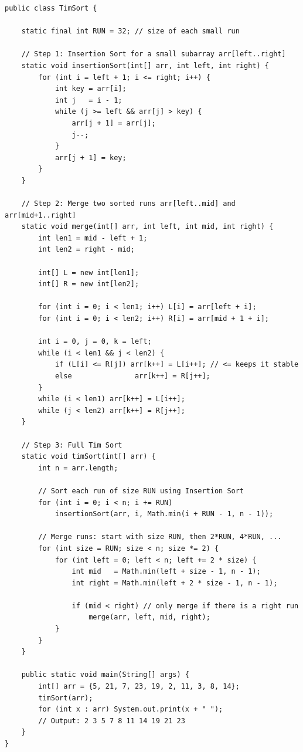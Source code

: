 \documentclass[12pt,a4paper,oneside]{book}
\begin{document}
\begin{lstlisting}[caption={Tim Sort --- simplified implementation showing core idea}]
public class TimSort {

    static final int RUN = 32; // size of each small run

    // Step 1: Insertion Sort for a small subarray arr[left..right]
    static void insertionSort(int[] arr, int left, int right) {
        for (int i = left + 1; i <= right; i++) {
            int key = arr[i];
            int j   = i - 1;
            while (j >= left && arr[j] > key) {
                arr[j + 1] = arr[j];
                j--;
            }
            arr[j + 1] = key;
        }
    }

    // Step 2: Merge two sorted runs arr[left..mid] and arr[mid+1..right]
    static void merge(int[] arr, int left, int mid, int right) {
        int len1 = mid - left + 1;
        int len2 = right - mid;

        int[] L = new int[len1];
        int[] R = new int[len2];

        for (int i = 0; i < len1; i++) L[i] = arr[left + i];
        for (int i = 0; i < len2; i++) R[i] = arr[mid + 1 + i];

        int i = 0, j = 0, k = left;
        while (i < len1 && j < len2) {
            if (L[i] <= R[j]) arr[k++] = L[i++]; // <= keeps it stable
            else               arr[k++] = R[j++];
        }
        while (i < len1) arr[k++] = L[i++];
        while (j < len2) arr[k++] = R[j++];
    }

    // Step 3: Full Tim Sort
    static void timSort(int[] arr) {
        int n = arr.length;

        // Sort each run of size RUN using Insertion Sort
        for (int i = 0; i < n; i += RUN)
            insertionSort(arr, i, Math.min(i + RUN - 1, n - 1));

        // Merge runs: start with size RUN, then 2*RUN, 4*RUN, ...
        for (int size = RUN; size < n; size *= 2) {
            for (int left = 0; left < n; left += 2 * size) {
                int mid   = Math.min(left + size - 1, n - 1);
                int right = Math.min(left + 2 * size - 1, n - 1);

                if (mid < right) // only merge if there is a right run
                    merge(arr, left, mid, right);
            }
        }
    }

    public static void main(String[] args) {
        int[] arr = {5, 21, 7, 23, 19, 2, 11, 3, 8, 14};
        timSort(arr);
        for (int x : arr) System.out.print(x + " ");
        // Output: 2 3 5 7 8 11 14 19 21 23
    }
}
\end{lstlisting}
\end{document}
